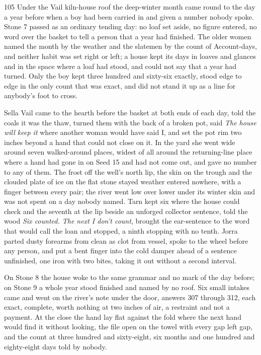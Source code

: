 \begin{CRchronicle}{105}
Under the Vail kiln-house roof the deep-winter month came round to the day a year before when a boy had been carried in and given a number nobody spoke. Stone 7 passed as an ordinary tending day: no loaf set aside, no figure entered, no word over the basket to tell a person that a year had finished. The older women named the month by the weather and the slatemen by the count of Account-days, and neither habit was set right or left; a house kept its days in loaves and glances and in the space where a loaf had stood, and could not say that a year had turned. Only the boy kept three hundred and sixty-six exactly, stood edge to edge in the only count that was exact, and did not stand it up as a line for anybody’s foot to cross.

Sella Vail came to the hearth before the basket at both ends of each day, told the coals it was the thaw, turned them with the back of a broken pot, said \emph{The house will keep it} where another woman would have said I, and set the pot rim two inches beyond a hand that could not close on it. In the yard she went wide around seven walked-around places, widest of all around the returning-line place where a hand had gone in on Seed 15 and had not come out, and gave no number to any of them. The frost off the well’s north lip, the skin on the trough and the clouded plate of ice on the flat stone stayed weather entered nowhere, with a finger between every pair; the river went low over lower under its winter skin and was not spent on a day nobody named. Tarn kept six where the house could check and the seventh at the lip beside an unforged collector sentence, told the wood \emph{Six counted. The next I don’t count}, brought the ear-sentence to the word that would call the loan and stopped, a ninth stopping with no tenth. Jorra parted dusty forearms from clean as clot from vessel, spoke to the wheel before any person, and put a bent finger into the cold damper ahead of a sentence unfinished, one iron with two bites, taking it out without a second interval.

On Stone 8 the house woke to the same grammar and no mark of the day before; on Stone 9 a whole year stood finished and named by no roof. Six small intakes came and went on the river’s note under the door, answers 307 through 312, each exact, complete, worth nothing at two inches of air, a restraint and not a payment. At the close the hand lay flat against the fold where the next hand would find it without looking, the file open on the towel with every gap left gap, and the count at three hundred and sixty-eight, six months and one hundred and eighty-eight days told by nobody.
\end{CRchronicle}
